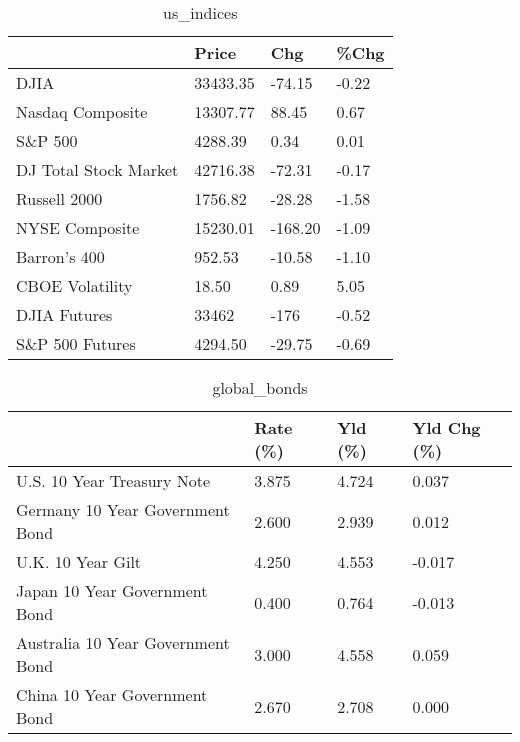 \documentclass{article}%
\begin{document}
%


\begin{table}[htbp]%
\caption{us\_indices}%
\centering%
\begin{adjustbox}{width=1\textwidth}%
\begin{tabular}{llll}
\toprule
                      &    Price &     Chg &  \%Chg \\
\midrule
                 DJIA & 33433.35 &  -74.15 & -0.22 \\
     Nasdaq Composite & 13307.77 &   88.45 &  0.67 \\
              S\&P 500 &  4288.39 &    0.34 &  0.01 \\
DJ Total Stock Market & 42716.38 &  -72.31 & -0.17 \\
         Russell 2000 &  1756.82 &  -28.28 & -1.58 \\
       NYSE Composite & 15230.01 & -168.20 & -1.09 \\
         Barron's 400 &   952.53 &  -10.58 & -1.10 \\
      CBOE Volatility &    18.50 &    0.89 &  5.05 \\
         DJIA Futures &    33462 &    -176 & -0.52 \\
      S\&P 500 Futures &  4294.50 &  -29.75 & -0.69 \\
\bottomrule
\end{tabular}
%
\end{adjustbox}%
\end{table}

%


\begin{table}[htbp]%
\caption{global\_bonds}%
\centering%
\begin{adjustbox}{width=1\textwidth}%
\begin{tabular}{llll}
\toprule
                                  & Rate (\%) & Yld (\%) & Yld Chg (\%) \\
\midrule
       U.S. 10 Year Treasury Note &    3.875 &   4.724 &       0.037 \\
  Germany 10 Year Government Bond &    2.600 &   2.939 &       0.012 \\
                U.K. 10 Year Gilt &    4.250 &   4.553 &      -0.017 \\
    Japan 10 Year Government Bond &    0.400 &   0.764 &      -0.013 \\
Australia 10 Year Government Bond &    3.000 &   4.558 &       0.059 \\
    China 10 Year Government Bond &    2.670 &   2.708 &       0.000 \\
\bottomrule
\end{tabular}
%
\end{adjustbox}%
\end{table}
\end{document}
